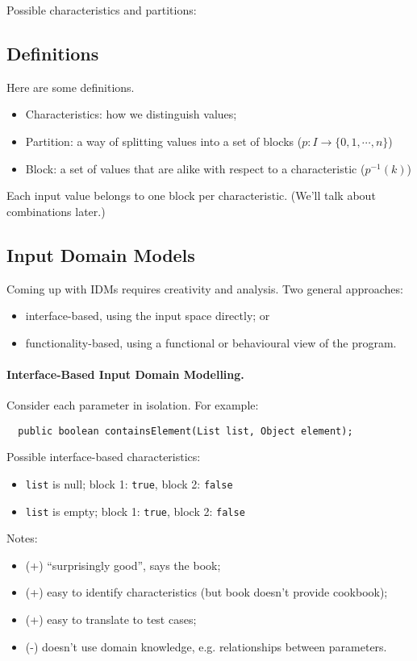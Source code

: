 \documentclass[11pt]{article}
\begin{document}
{\sf Possible characteristics and partitions:}\\[6em]


\clearpage
\subsection*{Definitions}
Here are some definitions. 
\begin{itemize}
\item Characteristics: how we distinguish values; 
\item Partition: a way of splitting values into a set of blocks ($p: I \rightarrow \{ 0, 1, \cdots, n \}$)
\item Block: a set of values that are alike with respect to a characteristic ($p^{-1}(k)$)
\end{itemize}
Each input value belongs to one block per characteristic. (We'll talk about
combinations later.)

\subsection*{Input Domain Models}
Coming up with IDMs requires creativity and analysis. Two general approaches:
\begin{itemize}
\item interface-based, using the input space directly; or
\item functionality-based, using a functional or behavioural view of the program.
\end{itemize}

\paragraph{Interface-Based Input Domain Modelling.} Consider each
parameter in isolation. For example: 
\begin{verbatim}
  public boolean containsElement(List list, Object element);
\end{verbatim}
Possible interface-based characteristics:
\begin{itemize}
\item {\tt list} is null; block 1: {\tt true}, block 2: {\tt false}
\item {\tt list} is empty; block 1: {\tt true}, block 2: {\tt false}
\end{itemize}

Notes:
\begin{itemize}
\item (+) ``surprisingly good'', says the book;
\item (+) easy to identify characteristics (but book doesn't provide cookbook);
\item (+) easy to translate to test cases;
\item (-) doesn't use domain knowledge, e.g. relationships between parameters.
\end{itemize}
\end{document}
